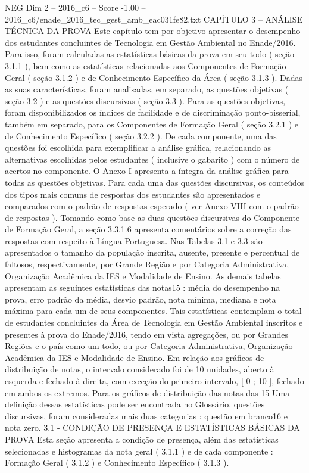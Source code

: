\begin{textsample}{NEG Dim 2 – 2016\_c6 – Score -1.00 – 2016\_c6/enade\_2016\_tec\_gest\_amb\_eac031fe82.txt}  \label{ex:f2_neg_222}
CAPÍTULO 3 – ANÁLISE TÉCNICA DA PROVA Este capítulo tem por objetivo apresentar o desempenho dos estudantes concluintes de Tecnologia em Gestão Ambiental no Enade/2016.
Para isso, foram calculadas as estatísticas básicas da prova em seu todo ( seção 3.1.1 ), bem como as estatísticas relacionadas aos Componentes de Formação Geral ( seção 3.1.2 ) e de Conhecimento Específico da Área ( seção 3.1.3 ).
Dadas as suas características, foram analisadas, em separado, as questões objetivas ( seção 3.2 ) e as questões discursivas ( seção 3.3 ).
Para as questões objetivas, foram disponibilizados os índices de facilidade e de discriminação ponto-bisserial, também em separado, para os Componentes de Formação Geral ( seção 3.2.1 ) e de Conhecimento Específico ( seção 3.2.2 ).
De cada componente, uma das questões foi escolhida para exemplificar a análise gráfica, relacionando as alternativas escolhidas pelos estudantes ( inclusive o gabarito ) com o número de acertos no componente.
O Anexo I apresenta a íntegra da análise gráfica para todas as questões objetivas.
Para cada uma das questões discursivas, os conteúdos dos tipos mais comuns de respostas dos estudantes são apresentados e comparados com o padrão de respostas esperado ( ver Anexo VIII com o padrão de respostas ).
Tomando como base as duas questões discursivas do Componente de Formação Geral, a seção 3.3.1.6 apresenta comentários sobre a correção das respostas com respeito à Língua Portuguesa.
Nas Tabelas 3.1 e 3.3 são apresentados o tamanho da população inscrita, ausente, presente e percentual de faltosos, respectivamente, por Grande Região e por Categoria Administrativa, Organização Acadêmica da IES e Modalidade de Ensino.
As demais tabelas apresentam as seguintes estatísticas das notas15 : média do desempenho na prova, erro padrão da média, desvio padrão, nota mínima, mediana e nota máxima para cada um de seus componentes.
Tais estatísticas contemplam o total de estudantes concluintes da Área de Tecnologia em Gestão Ambiental inscritos e presentes à prova do Enade/2016, tendo em vista agregações, ou por Grandes Regiões e o país como um todo, ou por Categoria Administrativa, Organização Acadêmica da IES e Modalidade de Ensino.
Em relação aos gráficos de distribuição de notas, o intervalo considerado foi de 10 unidades, aberto à esquerda e fechado à direita, com exceção do primeiro intervalo, [ 0 ; 10 ], fechado em ambos os extremos.
Para os gráficos de distribuição das notas das 15 Uma definição dessas estatísticas pode ser encontrada no Glossário. questões discursivas, foram consideradas mais duas categorias : questão em branco16 e nota zero. 3.1 - CONDIÇÃO DE PRESENÇA E ESTATÍSTICAS BÁSICAS DA PROVA Esta seção apresenta a condição de presença, além das estatísticas selecionadas e histogramas da nota geral ( 3.1.1 ) e de cada componente : Formação Geral ( 3.1.2 ) e Conhecimento Específico ( 3.1.3 ).

\end{textsample}
